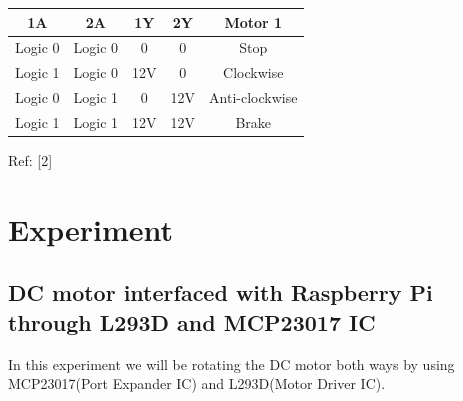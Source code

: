 \documentclass[11pt,a4paper]{article}
\begin{document}
    \vspace{0.5cm}
    \centering
    \begin{tabular}{|c|c|c|c|c|}
    	\hline
    	1A & 2A	& 1Y & 2Y & Motor 1\\
    	\hline
    	Logic 0	& Logic 0 & 0 & 0 & Stop \\
    	\hline
    	Logic 1	& Logic 0 & 12V	& 0	& Clockwise\\
    	\hline
    	Logic 0	& Logic 1 & 0 & 12V	& Anti-clockwise\\
    	\hline
    	Logic 1	& Logic 1 & 12V & 12V & Brake\\
    	\hline
    \end{tabular}
    \newline
    Ref: [2]
    
    \newpage
    \flushleft 
	\section{Experiment}
		\subsection{ DC motor interfaced with Raspberry Pi through L293D and MCP23017 IC}
	In this experiment we will be rotating the DC motor both ways by using MCP23017(Port Expander IC) and L293D(Motor Driver IC).
	  
\end{document}

